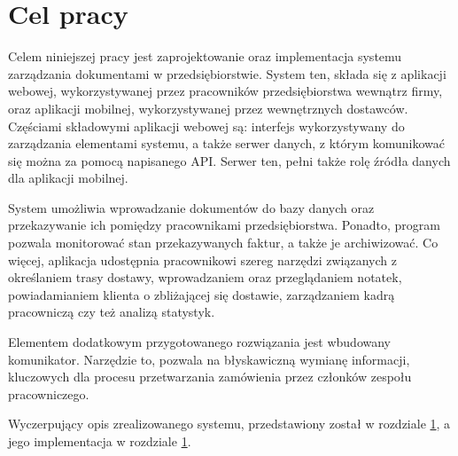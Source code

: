 \chapter{Cel pracy}
Celem niniejszej pracy jest zaprojektowanie oraz implementacja systemu zarządzania dokumentami w przedsiębiorstwie. System ten, składa się z aplikacji webowej, wykorzystywanej przez pracowników przedsiębiorstwa wewnątrz firmy, oraz aplikacji mobilnej, wykorzystywanej przez wewnętrznych dostawców. Częściami składowymi aplikacji webowej są: interfejs wykorzystywany do zarządzania elementami systemu, a także serwer danych, z którym komunikować się można za pomocą napisanego API. Serwer ten, pełni także rolę źródła danych dla aplikacji mobilnej.

System umożliwia wprowadzanie dokumentów do bazy danych oraz przekazywanie ich pomiędzy pracownikami przedsiębiorstwa. Ponadto, program pozwala monitorować stan przekazywanych faktur, a także je archiwizować. Co więcej, aplikacja udostępnia pracownikowi szereg narzędzi związanych z określaniem trasy dostawy, wprowadzaniem oraz przeglądaniem notatek, powiadamianiem klienta o zbliżającej się dostawie, zarządzaniem kadrą pracowniczą czy też analizą statystyk.

Elementem dodatkowym przygotowanego rozwiązania jest wbudowany komunikator. Narzędzie to, pozwala na błyskawiczną wymianę informacji,  kluczowych dla procesu przetwarzania zamówienia przez członków zespołu pracowniczego.

Wyczerpujący opis zrealizowanego systemu, przedstawiony został w rozdziale \ref{}, a jego implementacja w rozdziale \ref{}.